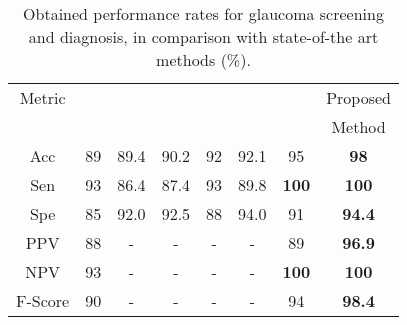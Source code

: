 \begin{table}[t]
\begin{center}
\small
\renewcommand{\arraystretch}{1.5}

 \begin{tabular}{|c|c|c|c|c|c|c|c|}
  \hline
  Metric & \citeauthor{guerre} & \citeauthor{cdr} & \citeauthor{cheng} & \citeauthor{ayub} & \citeauthor{joshi} & \citeauthor{singh} & Proposed \\
  
  {} & \citeyearpar{guerre} & \citeyearpar{cdr} & \citeyearpar{cheng} & \citeyearpar{ayub} & \citeyearpar{joshi} & \citeyearpar{singh} & Method \\
  
  \hline
  
  Acc & 89 & 89.4 & 90.2 & 92 & 92.1 & 95 & \textbf{98} \\
  \hline
  Sen & 93 & 86.4 & 87.4 & 93 & 89.8 & \textbf{100} & \textbf{100} \\
  \hline
  Spe & 85 & 92.0 & 92.5 & 88 & 94.0 & 91 & \textbf{94.4} \\
  \hline
  PPV & 88 & - & - & - & - & 89 & \textbf{96.9} \\
  \hline
  NPV & 93 & - & - & - & - & \textbf{100} & \textbf{100} \\
  \hline
  F-Score & 90 & - & - & - & - & 94 & \textbf{98.4} \\
  \hline
 \end{tabular}
\caption{\label{classification_results}Obtained performance rates for glaucoma screening and diagnosis, in comparison with state-of-the art methods (\%).}
 \end{center}
 
 \end{table}
